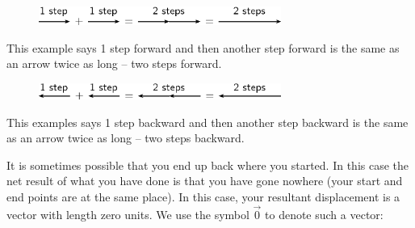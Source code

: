     \setcounter{subfigure}{0}


	\begin{figure}[H] %
    \begin{center}
    \label{m38813*id186654!!!underscore!!!media}\label{m38813*id186654!!!underscore!!!printimage}\includegraphics[width=300px]{col11305.imgs/m38813_PG11C1_014.png} %
        
      \vspace{2pt}
    \vspace{.1in}
    
    \end{center}

 \end{figure}   

    \addtocounter{footnote}{-0}
    
        \par 
        \label{m38813*id186661}This example says 1 step forward and then another step forward is the same as an arrow twice as long -- two steps forward.\par 
        \label{m38813*id186668}
          
    \setcounter{subfigure}{0}


	\begin{figure}[H] %
    \begin{center}
    \label{m38813*id186672!!!underscore!!!media}\label{m38813*id186672!!!underscore!!!printimage}\includegraphics[width=300px]{col11305.imgs/m38813_PG11C1_015.png} %
        
      \vspace{2pt}
    \vspace{.1in}
    
    \end{center}

 \end{figure}   

    \addtocounter{footnote}{-0}
    
        \par 
        \label{m38813*id186678}This examples says 1 step backward and then another step backward is the same as an arrow twice as long -- two steps backward.\par 
        \label{m38813*id186684}It is sometimes possible that you end up back where you started. In this case the net result of what you have done is that you have gone nowhere
(your start and end points are at the same place). In this case, your resultant displacement is a vector with length zero units. We use the symbol \begin{math}\stackrel{\to }{0}\end{math} to denote such a vector:\par 
        \label{m38813*id186706}
          
